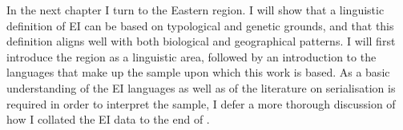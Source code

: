 In the next chapter I turn to the Eastern  region. I will show that a linguistic definition of EI can be based on typological and genetic grounds, and that this definition aligns well with both biological and geographical patterns. I will first introduce the region as a linguistic area, followed by an introduction to the languages that make up the sample upon which this work is based. As a basic understanding of the EI languages as well as of the literature on serialisation is required in order to interpret the sample, I defer a more thorough discussion of how I collated the EI data to the end of .
